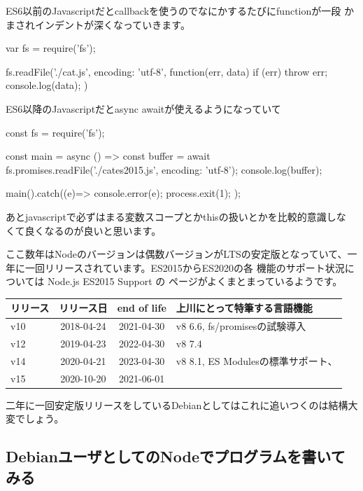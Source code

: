 \documentclass[mingoth,a4paper]{jsarticle}
\begin{document}
ES6以前のJavascriptだとcallbackを使うのでなにかするたびにfunctionが一段
かまされインデントが深くなっていきます。

\begin{commandline}
var fs = require('fs');

fs.readFile('./cat.js', {encoding: 'utf-8'}, function(err, data) {
    if (err) throw err;
    console.log(data);
})
\end{commandline}

ES6以降のJavascriptだとasync awaitが使えるようになっていて

\begin{commandline}
const fs  = require('fs');

const main = async () => {
    const buffer = await fs.promises.readFile('./cates2015.js',
					      {encoding: 'utf-8'});
    console.log(buffer);
}

main().catch((e)=>{
    console.error(e);
    process.exit(1);
});

\end{commandline}

あとjavascriptで必ずはまる変数スコープとかthisの扱いとかを比較的意識しな
くて良くなるのが良いと思います。

ここ数年はNodeのバージョンは偶数バージョンがLTSの安定版となっていて、一
年に一回リリースされています\cite{nodejsreleases}。ES2015からES2020の各
機能のサポート状況については Node.js ES2015 Support \cite{node-green}の
ページがよくまとまっているようです。

\begin{tabular}{|l|c|c|l|}
\hline
リリース & リリース日 & end of life & 上川にとって特筆する言語機能\\
\hline
v10 & 2018-04-24 & 2021-04-30 & v8 6.6, fs/promisesの試験導入 \\
v12 & 2019-04-23 & 2022-04-30 & v8 7.4\\
v14 & 2020-04-21 & 2023-04-30 & v8 8.1, ES Modulesの標準サポート、 \\
v15 & 2020-10-20 & 2021-06-01 &  \\
\hline
\end{tabular}

二年に一回安定版リリースをしているDebianとしてはこれに追いつくのは結構大
変でしょう。

\subsection{DebianユーザとしてのNodeでプログラムを書いてみる}
\end{document}
